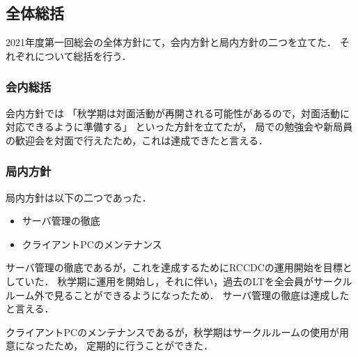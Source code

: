 \subsection*{全体総括}


2021年度第一回総会の全体方針にて，会内方針と局内方針の二つを立てた．
それぞれについて総括を行う．

\subsubsection*{会内総括}
会内方針では
「秋学期は対面活動が再開される可能性があるので，対面活動に対応できるように準備する」
といった方針を立てたが，
局での勉強会や新局員の歓迎会を対面で行えたため，これは達成できたと言える．

\subsubsection*{局内方針}

局内方針は以下の二つであった．
\begin{itemize}
    \item サーバ管理の徹底
    \item クライアントPCのメンテナンス
\end{itemize}

サーバ管理の徹底であるが，これを達成するためにRCCDCの運用開始を目標としていた．
秋学期に運用を開始し，それに伴い，過去のLTを全会員がサークルルーム外で見ることができるようになったため．
サーバ管理の徹底は達成したと言える．

クライアントPCのメンテナンスであるが，秋学期はサークルルームの使用が用意になったため，
定期的に行うことができた．
